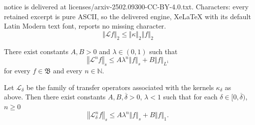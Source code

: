 \documentclass[10pt,a4paper]{amsart}
\newcommand\cL{{\mathcal L}}
\newcommand\fB{{\mathfrak B}}
\newcommand{\norm}[1]{\left\Vert#1\right\Vert}
\begin{document}
notice is delivered at licenses/arxiv-2502.09300-CC-BY-4.0.txt. Characters: every retained excerpt is pure ASCII, so the delivered engine, XeLaTeX with its default Latin Modern text font, reports no missing character.
\begin{equation}
\norm{\cL f}_{2}\leq \norm{\kappa}_{2}\norm{f}_{2}  \label{KF}
\end{equation}%

\begin{lemma}\label{lem:LY-ineq}
There exist constants $A,B>0$ and $\lambda \in \left( 0,1\right) $ such that 
\begin{equation}
\norm{\cL^{n}f}_{s}\leq A\lambda ^{n}\norm{f}_{s}+B\norm{ f}_{L^{1}}  \label{SLY}
\end{equation}%
for every $f\in \fB$ and every $n\in \mathbb{N}$.
\end{lemma}

\begin{lemma}\label{lem:LY_delta}
Let $\cL_{\delta }$ be the family of transfer operators associated with the kernels $\kappa_{\delta }$ as above. Then there exist constants $A,B,\overline{\delta }>0$, $\lambda<1$ such that for each $\delta \in \lbrack 0,\overline{\delta })$, $n\geq 0$ 
\begin{equation}
\norm{\cL_{\delta }^{n}f}_{s}\leq A\lambda ^{n}\norm{f}_{s}+B\norm{f}_{1} .
\end{equation}
\end{lemma}
\end{document}
